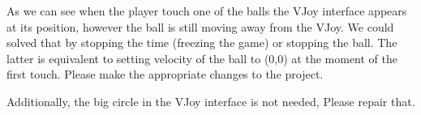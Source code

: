 \begin{extercises}
As we can see when the player touch one of the balls the VJoy interface appears at its position, however the ball is still moving away from the VJoy. We could solved that by stopping the time (freezing the game) or stopping the ball. The latter is equivalent to setting velocity of the ball to (0,0) at the moment of the first touch. Please make the appropriate changes to the project.

Additionally, the big circle in the VJoy interface is not needed, Please repair that.
\end{extercises}

